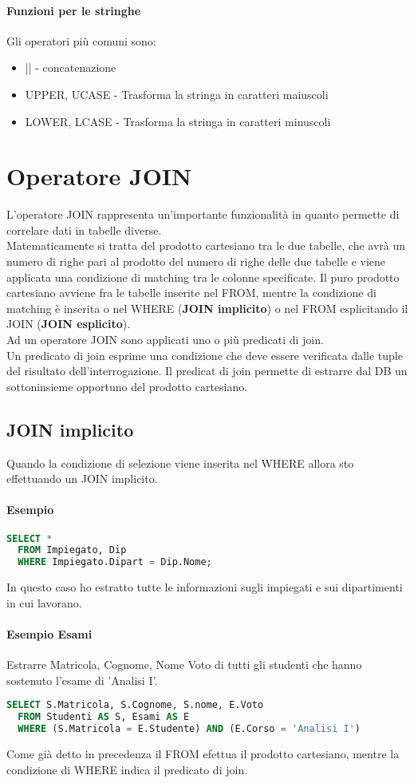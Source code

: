 \paragraph*{Funzioni per le stringhe}
Gli operatori più comuni sono:
\begin{itemize}
  \item || - concatenazione
  \item UPPER, UCASE - Trasforma la stringa in caratteri maiuscoli
  \item LOWER, LCASE - Trasforma la stringa in caratteri minuscoli
\end{itemize}
\section{Operatore JOIN}
L'operatore JOIN rappresenta un'importante funzionalità in quanto
permette di correlare dati in tabelle diverse.\\
Matematicamente si tratta del prodotto cartesiano tra le due tabelle,
che avrà un numero di righe pari al prodotto del numero di righe
delle due tabelle e viene applicata una condizione di matching tra 
le colonne specificate. Il puro prodotto cartesiano avviene fra le
tabelle inserite nel FROM, mentre la condizione di matching è inserita
o nel WHERE (\textbf{JOIN implicito}) o nel FROM esplicitando il JOIN (\textbf{JOIN esplicito}).\\
Ad un operatore JOIN sono applicati uno o più predicati di join.\\
Un predicato di join esprime una condizione che deve essere verificata
dalle tuple del risultato dell'interrogazione.
Il predicat di join permette di estrarre dal DB un sottoninsieme opportuno
del prodotto cartesiano.
\subsection{JOIN implicito}
Quando la condizione di selezione viene inserita nel WHERE allora sto
effettuando un JOIN implicito.
\paragraph*{Esempio}
\begin{lstlisting}[language=SQL]
  SELECT *
  FROM Impiegato, Dip
  WHERE Impiegato.Dipart = Dip.Nome;
\end{lstlisting}
In questo caso ho estratto tutte le informazioni sugli impiegati e sui
dipartimenti in cui lavorano.\\
\paragraph*{Esempio Esami}
Estrarre Matricola, Cognome, Nome Voto di tutti gli studenti che
hanno sostenuto l'esame di 'Analisi I'.
\begin{lstlisting}[language=SQL]
  SELECT S.Matricola, S.Cognome, S.nome, E.Voto
  FROM Studenti AS S, Esami AS E
  WHERE (S.Matricola = E.Studente) AND (E.Corso = 'Analisi I')
\end{lstlisting}
Come già detto in precedenza il FROM efettua il prodotto cartesiano, mentre
la condizione di WHERE indica il predicato di join.\\
